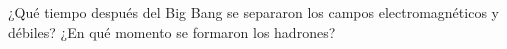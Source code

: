 \documentclass[./../main.tex]{subfiles}
\begin{document}
	\begin{exercise}
		¿Qué tiempo después del Big Bang se separaron los campos electromagnéticos y débiles? ¿En qué momento se formaron los hadrones?
	\end{exercise}
\end{document}
